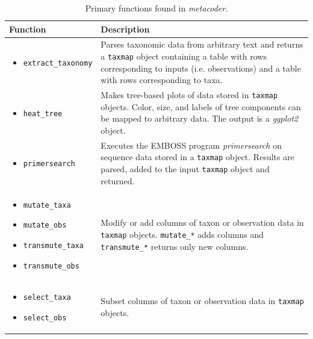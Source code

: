 \documentclass[10pt,letterpaper]{article}
\begin{document}
\begin{table}
	\caption{{\label{tab:table1} Primary functions found in \textit{metacoder}.}}
	\begin{tabular}[t]{p{4cm}  p{8.5cm}}
		\hline{\textbf{Function}}      & \textbf{Description}    \\
		\hline
		\begin{itemize}
			\setlength\itemsep{0em}
			\item \texttt{extract\_taxonomy}
		\end{itemize} & Parses taxonomic data from arbitrary text and returns a \texttt{taxmap} object containing a table with rows corresponding to inputs (i.e. observations) and a table with rows corresponding to taxa.       \\
		\hline
		\begin{itemize}
			\setlength\itemsep{0em}
			\item \texttt{heat\_tree}
		\end{itemize} & Makes tree-based plots of data stored in \texttt{taxmap} objects. Color, size, and labels of tree components can be mapped to arbitrary data. The output is a \textit{ggplot2} object.     \\
		\hline
		\begin{itemize}
			\setlength\itemsep{0em}
			\item \texttt{primersearch}
		\end{itemize} & Executes the EMBOSS program \textit{primersearch} on sequence data stored in a \texttt{taxmap} object. Results are parsed, added to the input \texttt{taxmap} object and returned.                       \\
		\hline
		\begin{itemize}
			\setlength\itemsep{0em}
			\item \texttt{mutate\_taxa}
			\item \texttt{mutate\_obs}
			\item \texttt{transmute\_taxa}
			\item \texttt{transmute\_obs}
		\end{itemize} & Modify or add columns of taxon or observation data in \texttt{taxmap} objects. \texttt{mutate\_*} adds columns and \texttt{transmute\_*} returns only new columns. \\
		\hline
		\begin{itemize}
			\setlength\itemsep{0em}
			\item \texttt{select\_taxa}
			\item \texttt{select\_obs}
		\end{itemize} & Subset columns of taxon or observation data in \texttt{taxmap} objects.         \\

\end{tabular}
\end{table}
\end{document}
